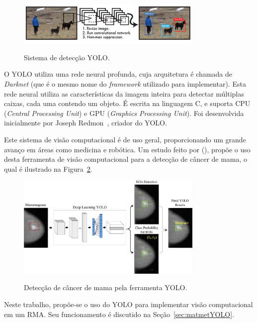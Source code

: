 \begin{figure}[!hbtp]
  \centering
   \caption{Sistema de detecção YOLO.}
    \includegraphics[width = 0.8\textwidth]{Caps/Figs/ref-teorico/YOLO-detection.png}
   \label{fig:YOLOcdetectionSystem}
\end{figure}

O YOLO utiliza uma rede neural profunda, cuja arquitetura é chamada de \textit{Darknet} (que é o mesmo nome do \textit{framework} utilizado para implementar). Esta rede neural utiliza as características da imagem inteira para detectar múltiplas caixas, cada uma contendo um objeto. É escrita na linguagem C, e suporta CPU (\textit{Central Processing Unit}) e GPU (\textit{Graphics Processing Unit}). Foi desenvolvida inicialmente por Joseph Redmon~\cite{Redmon_2016_CVPR}, criador do YOLO.

Este sistema de visão computacional é de uso geral, proporcionando um grande avanço em áreas como medicina e robótica. Um estudo feito por \citeauthor{al2018simultaneous} (\citeyear{al2018simultaneous}), propõe o uso desta ferramenta de visão computacional para a detecção de câncer de mama, o qual é ilustrado na Figura~\ref{fig:YOLOcancerMAMA}.

\begin{figure}[!hbtp]
  \centering
   \caption{Detecção de câncer de mama pela ferramenta YOLO.}
    \includegraphics[width = 0.8\textwidth]{Caps/Figs/ref-teorico/YOLO-breastCancer.jpg}
   \label{fig:YOLOcancerMAMA}
\end{figure}

Neste trabalho, propõe-se o uso do YOLO para implementar visão computacional em um RMA. Seu funcionamento é discutido na Seção~\ref{sec:matmetYOLO}.

